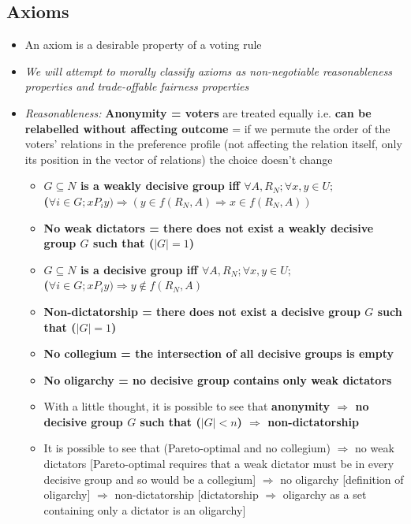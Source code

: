 \documentclass[20pt,a4paper,landscape]{extarticle}
\begin{document}
\begin{flushleft}
\subsection{Axioms}
\begin{itemize}
\item An axiom is a desirable property of a voting rule
\item \textit{We will attempt to morally classify axioms as non-negotiable reasonableness properties and trade-offable fairness properties}
\item \textit{Reasonableness:} \textbf{Anonymity = voters} are treated equally i.e. \textbf{can be relabelled without affecting outcome} = if we permute the order of the voters' relations in the preference profile (not affecting the relation itself, only its position in the vector of relations) the choice doesn't change
    \begin{itemize}
    \item \textbf{$G \subseteq N$ is a weakly decisive group iff $\forall A, R_N; \forall x, y \in U;$\\
    ($\forall i \in G; x P_i y) \Rightarrow (y \in f(R_N, A) \Rightarrow x \in f(R_N, A))$}
    \item \textbf{No weak dictators = there does not exist a weakly decisive group $G$ such that ($|G|=1$)}
    \item \textbf{$G \subseteq N$ is a decisive group iff $\forall A, R_N; \forall x, y \in U;$\\
    ($\forall i \in G; x P_i y) \Rightarrow y \notin f(R_N, A)$}
    \item \textbf{Non-dictatorship = there does not exist a decisive group $G$ such that ($|G|=1$)}
    \item \textbf{No collegium = the intersection of all decisive groups is empty}
    \item \textbf{No oligarchy = no decisive group contains only weak dictators}
    \item With a little thought, it is possible to see that \textbf{anonymity $\Rightarrow$ no decisive group $G$ such that ($|G|<n$) $\Rightarrow$ non-dictatorship}
    \item It is possible to see that (Pareto-optimal and no collegium) $\Rightarrow$ no weak dictators [Pareto-optimal requires that a weak dictator must be in every decisive group and so would be a collegium] $\Rightarrow$ no oligarchy [definition of oligarchy] $\Rightarrow$ non-dictatorship [dictatorship $\Rightarrow$ oligarchy as a set containing only a dictator is an oligarchy]

\end{itemize}
\end{itemize}
\end{flushleft}
\end{document}
